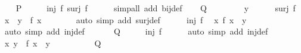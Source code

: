 \begin{isabellebody}
%
\isadelimproof
%
\endisadelimproof
%
\isatagproof
{}\isamarkupfalse%
\isanewline
\ \ \isamarkupfalse%
\ {\isacharquery}{\kern0pt}P\isanewline
\ \ \isamarkupfalse%
\ \isamarkupfalse%
\ {\isacartoucheopen}inj\ f{\isacartoucheclose}\ {\isacartoucheopen}surj\ f{\isacartoucheclose}\isanewline
\ \ \ \ \isamarkupfalse%
\ {\isacharparenleft}{\kern0pt}simp{\isacharunderscore}{\kern0pt}all\ add{\isacharcolon}{\kern0pt}\ bij{\isacharunderscore}{\kern0pt}def{\isacharparenright}{\kern0pt}\isanewline
\ \ \isamarkupfalse%
\ {\isacharquery}{\kern0pt}Q\isanewline
\ \ \isamarkupfalse%
\isanewline
\ \ \ \ \isamarkupfalse%
\ y\isanewline
\ \ \ \ \isamarkupfalse%
\ {\isacartoucheopen}surj\ f{\isacartoucheclose}\ \isamarkupfalse%
\ x\ \ {\isacartoucheopen}y\ {\isacharequal}{\kern0pt}\ f\ x{\isacartoucheclose}\isanewline
\ \ \ \ \ \ \isamarkupfalse%
\ {\isacharparenleft}{\kern0pt}auto\ simp\ add{\isacharcolon}{\kern0pt}\ surj{\isacharunderscore}{\kern0pt}def{\isacharparenright}{\kern0pt}\isanewline
\ \ \ \ \isamarkupfalse%
\ {\isacartoucheopen}inj\ f{\isacartoucheclose}\ \isamarkupfalse%
\ {\isacartoucheopen}{\isasymexists}{\isacharbang}{\kern0pt}x{\isachardot}{\kern0pt}\ f\ x\ {\isacharequal}{\kern0pt}\ y{\isacartoucheclose}\isanewline
\ \ \ \ \ \ \isamarkupfalse%
\ {\isacharparenleft}{\kern0pt}auto\ simp\ add{\isacharcolon}{\kern0pt}\ inj{\isacharunderscore}{\kern0pt}def{\isacharparenright}{\kern0pt}\isanewline
\ \ \isamarkupfalse%
\isanewline
{}\isamarkupfalse%
\isanewline
\ \ \isamarkupfalse%
\ {\isacharquery}{\kern0pt}Q\isanewline
\ \ \isamarkupfalse%
\ \isamarkupfalse%
\ {\isacartoucheopen}inj\ f{\isacartoucheclose}\isanewline
\ \ \ \ \isamarkupfalse%
\ {\isacharparenleft}{\kern0pt}auto\ simp\ add{\isacharcolon}{\kern0pt}\ inj{\isacharunderscore}{\kern0pt}def{\isacharparenright}{\kern0pt}\isanewline
\ \ \isamarkupfalse%
\ \isamarkupfalse%
\ {\isacartoucheopen}{\isasymexists}x{\isachardot}{\kern0pt}\ y\ {\isacharequal}{\kern0pt}\ f\ x{\isacartoucheclose}\ \ y\isanewline
\ \ \isamarkupfalse%
\ {\isacharminus}{\kern0pt}\isanewline
\ \ \ \ \isamarkupfalse%
\ {\isacartoucheopen}{\isacharquery}{\kern0pt}Q{\isacartoucheclose}\ \isamarkupfalse%

\end{isabellebody}
